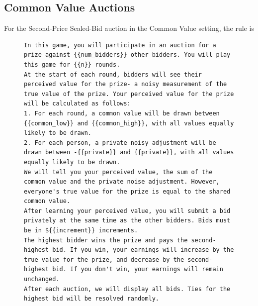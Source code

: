 \documentclass{article} %
\begin{document}
\subsection{Common Value Auctions}

For the Second-Price Sealed-Bid auction in the Common Value setting, the rule is

\begin{figure}[H]
\centering
\begin{minipage}{0.95\textwidth}
\begin{lstlisting}
In this game, you will participate in an auction for a prize against {{num_bidders}} other bidders. You will play this game for {{n}} rounds.
At the start of each round, bidders will see their perceived value for the prize- a noisy measurement of the true value of the prize. Your perceived value for the prize will be calculated as follows:
1. For each round, a common value will be drawn between {{common_low}} and {{common_high}}, with all values equally likely to be drawn.
2. For each person, a private noisy adjustment will be drawn between -{{private}} and {{private}}, with all values equally likely to be drawn.
We will tell you your perceived value, the sum of the common value and the private noise adjustment. However, everyone's true value for the prize is equal to the shared common value.
After learning your perceived value, you will submit a bid privately at the same time as the other bidders. Bids must be in ${{increment}} increments.
The highest bidder wins the prize and pays the second-highest bid. If you win, your earnings will increase by the true value for the prize, and decrease by the second-highest bid. If you don't win, your earnings will remain unchanged.
After each auction, we will display all bids. Ties for the highest bid will be resolved randomly.
\end{lstlisting}
\end{minipage}
\label{fig:sealbid_prompt-6}
\end{figure}
\end{document}
